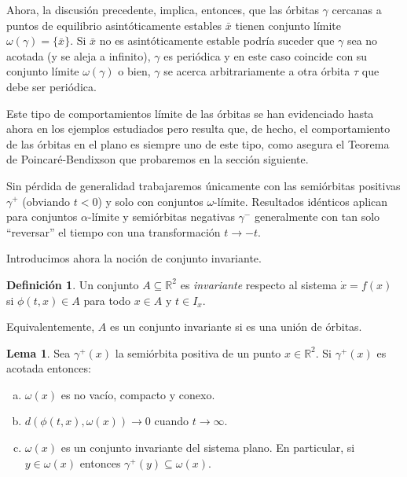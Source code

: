 \documentclass[11pt]{book}
\theoremstyle{definition}
\newtheorem{definition}{Definición}
\numberwithin{definition}{section}
\theoremstyle{theorem}
\newtheorem{lemma}{Lema}
\numberwithin{theorem}{section}
\numberwithin{lemma}{section}
\numberwithin{corollary}{section}
\theoremstyle{plain}
\numberwithin{example}{section}
\newcommand{\R}{{\ensuremath{\mathbb{R}}}}
\begin{document}
Ahora, la discusión precedente, implica, entonces, que las órbitas $\gamma$ cercanas a puntos de equilibrio asintóticamente estables $\bar{x}$ tienen conjunto límite $\omega(\gamma) = \{\bar{x}\}$. Si $\bar{x}$ no es asintóticamente estable podría suceder que $\gamma$ sea no acotada (y se aleja a infinito), $\gamma$ es periódica y en este caso coincide con su conjunto límite $\omega(\gamma)$ o bien, $\gamma$ se acerca arbitrariamente a otra órbita $\tau$ que debe ser periódica.

Este tipo de comportamientos límite de las órbitas se han evidenciado hasta ahora en los ejemplos estudiados pero resulta que, de hecho, el comportamiento de las órbitas en el plano es siempre uno de este tipo, como asegura el Teorema de Poincaré-Bendixson que probaremos en la sección siguiente.

Sin pérdida de generalidad trabajaremos únicamente con las semiórbitas positivas $\gamma^+$ (obviando $t < 0$) y solo con conjuntos $\omega$-límite. Resultados idénticos aplican para conjuntos $\alpha$-límite y semiórbitas negativas $\gamma^-$ generalmente con tan solo ``reversar'' el tiempo con una transformación $t \to -t$.

Introducimos ahora la noción de conjunto invariante.

\begin{definition} \label{def:conjuntoinvariante}
Un conjunto $A \subseteq \R^2$ es \emph{invariante} respecto al sistema $\dot{x} = f(x)$ si $\phi(t,x) \in A$ para todo $x \in A$ y $t \in I_x$.
\end{definition}

Equivalentemente, $A$ es un conjunto invariante si es una unión de órbitas.


\begin{lemma} \label{lem:orbitaslimite}
Sea $\gamma^+(x)$ la semiórbita positiva de un punto $x \in \R^2$. Si $\gamma^+(x)$ es acotada entonces:

	\begin{enumerate}[(a)]
		\item $\omega(x)$ es no vacío, compacto y conexo.
		\item $d(\phi(t,x), \omega(x)) \to 0$ cuando $t \to \infty$.
		\item $\omega(x)$ es un conjunto invariante del sistema plano. En particular, si $y \in \omega(x)$ entonces $\gamma^+(y) \subseteq \omega(x)$.
	\end{enumerate}
\end{lemma}
\end{document}
